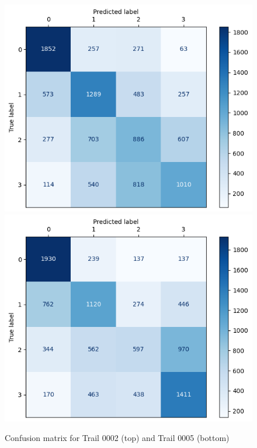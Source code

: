 \documentclass{article}
\begin{document}
\begin{figure}[H]
    \centering
    \includegraphics[width=0.5\linewidth]{images/trail_0002.png}
    \includegraphics[width=0.5\linewidth]{images/trail_0005.png}
    \caption{Confusion matrix for Trail 0002 (top) and Trail 0005 (bottom)}
    \label{fig:confusion_matrix}
\end{figure}



\end{document}
